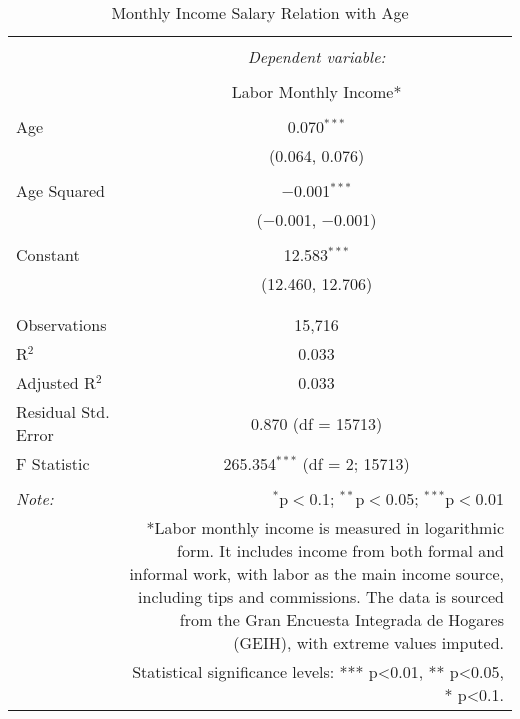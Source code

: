 
\begin{table}[!htbp] \centering 
  \caption{Monthly Income Salary Relation with Age} 
  \label{} 
\begin{tabular}{@{\extracolsep{5pt}}lc} 
\\[-1.8ex]\hline 
\hline \\[-1.8ex] 
 & \multicolumn{1}{c}{\textit{Dependent variable:}} \\ 
\cline{2-2} 
\\[-1.8ex] & Labor Monthly Income* \\ 
\hline \\[-1.8ex] 
 Age & 0.070$^{***}$ \\ 
  & (0.064, 0.076) \\ 
  & \\ 
 Age Squared & $-$0.001$^{***}$ \\ 
  & ($-$0.001, $-$0.001) \\ 
  & \\ 
 Constant & 12.583$^{***}$ \\ 
  & (12.460, 12.706) \\ 
  & \\ 
\hline \\[-1.8ex] 
Observations & 15,716 \\ 
R$^{2}$ & 0.033 \\ 
Adjusted R$^{2}$ & 0.033 \\ 
Residual Std. Error & 0.870 (df = 15713) \\ 
F Statistic & 265.354$^{***}$ (df = 2; 15713) \\ 
\hline 
\hline \\[-1.8ex] 
\textit{Note:}  & \multicolumn{1}{r}{$^{*}$p$<$0.1; $^{**}$p$<$0.05; $^{***}$p$<$0.01} \\ 
 & \multicolumn{1}{r}{*Labor monthly income is measured in logarithmic form. It includes income from both formal and informal work, with labor as the main income source, including tips and commissions. The data is sourced from the Gran Encuesta Integrada de Hogares (GEIH), with extreme values imputed.} \\ 
 & \multicolumn{1}{r}{Statistical significance levels: *** p<0.01, ** p<0.05, * p<0.1.} \\ 
\end{tabular} 
\end{table} 
